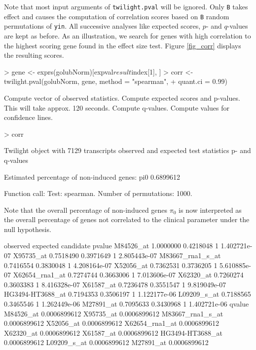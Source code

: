 \documentclass[11pt,a4paper,fleqn]{report}
\newcommand{\Rfunction}[1]{{\texttt{#1}}}
\newcommand{\Rfunarg}[1]{{\texttt{#1}}}
\begin{document}
Note that most input arguments of \Rfunction{twilight.pval} will be ignored. Only \Rfunarg{B} takes effect and causes the computation of correlation scores based on \Rfunarg{B} random permutations of \Rfunarg{yin}. All successive analyses like expected scores, $p$- and $q$-values are kept as before. As an illustration, we search for genes with high correlation to the highest scoring gene found in the effect size test. Figure \ref{fig_corr} displays the resulting scores.

\begin{Schunk}
\begin{Sinput}
> gene <- exprs(golubNorm)[expval$result$index[1], ]
> corr <- twilight.pval(golubNorm, gene, method = "spearman", 
+     quant.ci = 0.99)
\end{Sinput}
\begin{Soutput}
Compute vector of observed statistics. 
Compute expected scores and p-values. This will take approx. 120 seconds. 
Compute q-values. 
Compute values for confidence lines. 
\end{Soutput}
\begin{Sinput}
> corr
\end{Sinput}
\begin{Soutput}
 Twilight object with
     7129 transcripts
     observed and expected test statistics
     p- and q-values

 Estimated percentage of non-induced genes:
      pi0 
0.6899612 

 Function call:
 Test: spearman. Number of permutations: 1000. 
\end{Soutput}
\end{Schunk}
Note that the overall percentage of non-induced genes $\pi_0$ is now interpreted as the overall percentage of genes not correlated to the clinical parameter under the null hypothesis.

\begin{Schunk}
\begin{Soutput}
                  observed  expected candidate       pvalue
M84526_at        1.0000000 0.4218048         1 1.402721e-07
X95735_at        0.7518490 0.3971649         1 2.805443e-07
M83667_rna1_s_at 0.7416554 0.3830048         1 4.208164e-07
X52056_at        0.7362531 0.3736205         1 5.610885e-07
X62654_rna1_at   0.7274744 0.3663006         1 7.013606e-07
X62320_at        0.7260274 0.3603383         1 8.416328e-07
X61587_at        0.7236478 0.3551547         1 9.819049e-07
HG3494-HT3688_at 0.7194353 0.3506197         1 1.122177e-06
L09209_s_at      0.7188565 0.3465546         1 1.262449e-06
M27891_at        0.7095633 0.3430968         1 1.402721e-06
                       qvalue
M84526_at        0.0006899612
X95735_at        0.0006899612
M83667_rna1_s_at 0.0006899612
X52056_at        0.0006899612
X62654_rna1_at   0.0006899612
X62320_at        0.0006899612
X61587_at        0.0006899612
HG3494-HT3688_at 0.0006899612
L09209_s_at      0.0006899612
M27891_at        0.0006899612
\end{Soutput}
\end{Schunk}
\end{document}
